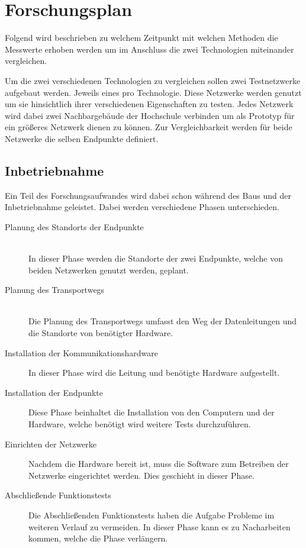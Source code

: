 \chapter{Forschungsplan}

Folgend wird beschrieben zu welchem Zeitpunkt mit welchen Methoden die Messwerte erhoben werden um im Anschluss die zwei Technologien miteinander vergleichen.

Um die zwei verschiedenen Technologien zu vergleichen sollen zwei Testnetzwerke aufgebaut werden.
Jeweils eines pro Technologie.
Diese Netzwerke werden genutzt um sie hinsichtlich ihrer verschiedenen Eigenschaften zu testen.
Jedes Netzwerk wird dabei zwei Nachbargebäude der Hochschule verbinden um als Prototyp für ein größeres Netzwerk dienen zu können.
Zur Vergleichbarkeit werden für beide Netzwerke die selben Endpunkte definiert.

\section{Inbetriebnahme}\label{inbetriebnahme}

Ein Teil des Forschungsaufwandes wird dabei schon während des Baus und der Inbetriebnahme geleistet.
Dabei werden verschiedene Phasen unterschieden.

\begin{description}
    \item [Planung des Standorts der Endpunkte]\hfill \\
        In dieser Phase werden die Standorte der zwei Endpunkte, welche von beiden Netzwerken genutzt werden, geplant.
    \item [Planung des Transportwegs]\hfill \\
        Die Planung des Transportwegs umfasst den Weg der Datenleitungen und die Standorte von benötigter Hardware.
    \item [Installation der Kommunikationshardware]
        In dieser Phase wird die Leitung und benötigte Hardware aufgestellt.
    \item [Installation der Endpunkte]
        Diese Phase beinhaltet die Installation von den Computern und der Hardware, welche benötigt wird weitere Tests durchzuführen.
    \item [Einrichten der Netzwerke]
        Nachdem die Hardware bereit ist, muss die Software zum Betreiben der Netzwerke eingerichtet werden. Dies geschieht in dieser Phase.
    \item [Abschließende Funktionstests]
        Die Abschließenden Funktionstests haben die Aufgabe Probleme im weiteren Verlauf zu vermeiden.
        In dieser Phase kann es zu Nacharbeiten kommen, welche die Phase verlängern.
\end{description}

